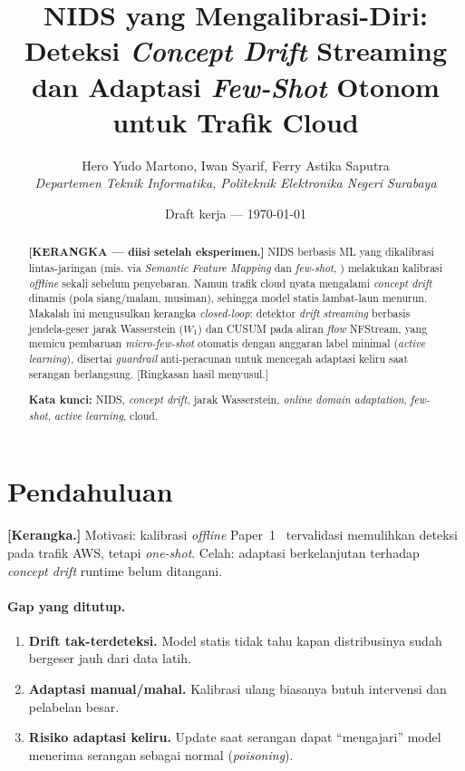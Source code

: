 \documentclass[11pt,a4paper]{article}
\title{\textbf{NIDS yang Mengalibrasi-Diri: Deteksi \emph{Concept Drift}
Streaming dan Adaptasi \emph{Few-Shot} Otonom untuk Trafik Cloud}}
\author{Hero Yudo Martono, \quad Iwan Syarif, \quad Ferry Astika Saputra \\
\textit{Departemen Teknik Informatika, Politeknik Elektronika Negeri Surabaya}}
\date{Draft kerja --- \today}
\begin{document}
\maketitle

\begin{abstract}
\textbf{[KERANGKA — diisi setelah eksperimen.]} NIDS berbasis ML yang dikalibrasi
lintas-jaringan (mis. via \emph{Semantic Feature Mapping} dan \emph{few-shot},
\cite{paper1}) melakukan kalibrasi \emph{offline} sekali sebelum penyebaran. Namun
trafik cloud nyata mengalami \emph{concept drift} dinamis (pola siang/malam,
musiman), sehingga model statis lambat-laun menurun. Makalah ini mengusulkan
kerangka \emph{closed-loop}: detektor \emph{drift} \emph{streaming} berbasis
jendela-geser jarak Wasserstein ($W_1$) dan CUSUM pada aliran \emph{flow}
NFStream, yang memicu pembaruan \emph{micro-few-shot} otomatis dengan anggaran
label minimal (\emph{active learning}), disertai \emph{guardrail} anti-peracunan
untuk mencegah adaptasi keliru saat serangan berlangsung. [Ringkasan hasil
menyusul.]

\vspace{0.5em}
\noindent\textbf{Kata kunci:} NIDS, \emph{concept drift}, jarak Wasserstein,
\emph{online domain adaptation}, \emph{few-shot}, \emph{active learning}, cloud.
\end{abstract}

\section{Pendahuluan}
\label{sec:intro}
\textbf{[Kerangka.]} Motivasi: kalibrasi \emph{offline} Paper~1~\cite{paper1}
tervalidasi memulihkan deteksi pada trafik AWS, tetapi \emph{one-shot}. Celah:
adaptasi berkelanjutan terhadap \emph{concept drift} runtime belum ditangani.

\paragraph{Gap yang ditutup.}
\begin{enumerate}
  \item \textbf{Drift tak-terdeteksi.} Model statis tidak tahu kapan
  distribusinya sudah bergeser jauh dari data latih.
  \item \textbf{Adaptasi manual/mahal.} Kalibrasi ulang biasanya butuh intervensi
  dan pelabelan besar.
  \item \textbf{Risiko adaptasi keliru.} Update saat serangan dapat
  ``mengajari'' model menerima serangan sebagai normal (\emph{poisoning}).
\end{enumerate}
\end{document}
